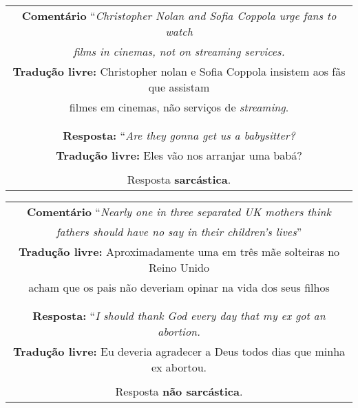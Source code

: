 \begin{center}
\begin{tabular}{|c|}

\hline

\textbf{Comentário} ``\textit{Christopher Nolan and Sofia Coppola urge fans to
watch} \\
\textit{films in cinemas, not on streaming services.} \\

\textbf{Tradução livre:} Christopher nolan e Sofia Coppola insistem aos fãs que
assistam \\
filmes em cinemas, não serviços de \textit{streaming}. \\ \\

\hline

\\

\textbf{Resposta:} ``\textit{Are they gonna get us a babysitter?} \\

\textbf{Tradução livre:} Eles vão nos arranjar uma babá? \\ \\

Resposta \textbf{sarcástica}.

\\ \hline

\end{tabular}
\end{center}

\begin{center}
\begin{tabular}{|c|}

\hline

\textbf{Comentário} ``\textit{Nearly one in three separated UK mothers think} \\
\textit{fathers should have no say in their children's lives}'' \\

\textbf{Tradução livre:} Aproximadamente uma em três mãe solteiras no Reino Unido\\
acham que os pais não deveriam opinar na vida dos seus filhos \\ \\

\hline

\\

\textbf{Resposta:} ``\textit{I should thank God every day that my ex got an abortion.} \\

\textbf{Tradução livre:} Eu deveria agradecer a Deus todos dias que minha ex abortou. \\ \\

Resposta \textbf{não sarcástica}.

\\ \hline

\end{tabular}
\end{center}


